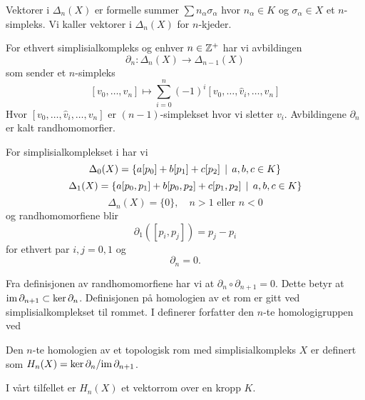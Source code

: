 Vektorer i $\Delta_n(X)$ er formelle summer $\sum
n_\alpha\sigma_\alpha$ hvor $n_\alpha\in K$ og
$\sigma_\alpha\in X$ et $n$-simpleks. Vi kaller vektorer
i $\Delta_n(X)$ for $n$-kjeder. 

\begin{definisjon}\label{def:randhom}
  For ethvert simplisialkompleks og enhver $n\in\mathbb{Z}^+$
  har vi avbildingen 
  \[\partial_n: \Delta_n(X)\to\Delta_{n-1}(X)\]
  som sender et $n$-simpleks
  \[[v_0,\dots,v_n]\mapsto
  \sum_{i=0}^n(-1)^i[v_0,\dots,\hat{v}_i,\dots,v_n]\]
  Hvor $[v_0,\dots,\hat{v}_i,\dots,v_n]$ er
  $(n-1)$-simplekset hvor vi sletter $v_i$. Avbildingene
  $\partial_n$ er kalt randhomomorfier.
\end{definisjon}

\begin{eksempel}\label{eks:randhom}
  For simplisialkomplekset i 
  har vi
  \[\Delta_0(X) = \left\{a[p_0]+b[p_1]+c[p_2]\,\mid\,a,b,c\in K\right\}\]
  \[\Delta_1(X)
  = \left\{a[p_0,p_1]+b[p_0,p_2]+c[p_1,p_2]\,\mid\,a,b,c\in K\right\}\]
  \[\Delta_n(X) = \{0\},\quad n>1\text{ eller } n<0\]
  og randhomomorfiene blir
  \[\partial_1([p_i,p_j]) = p_j-p_i\]
  for ethvert par $i,j=0,1$ og
  \[\partial_n = 0.\]
\end{eksempel}

Fra definisjonen av randhomomorfiene har vi at
$\partial_n\circ\partial_{n+1}=0$. Dette betyr at
$\textnormal{im}\,\partial_{n+1}\subset\ker\partial_n$.
Definisjonen på homologien av et rom er gitt ved
simplisialkomplekset til rommet. I \citep[seksjon
2.1]{Hatcher2001} definerer forfatter den $n$-te
  homologigruppen ved

\begin{definisjon}\label{def:Homologi}
  Den $n$-te homologien av et topologisk rom med
  simplisialkompleks $X$ er definert
  som $H_n(X) = \ker\partial_n/\textnormal{im}\,\partial_{n+1}$.
\end{definisjon}

I vårt tilfellet er $H_n(X)$ et vektorrom over en kropp
$K$.




